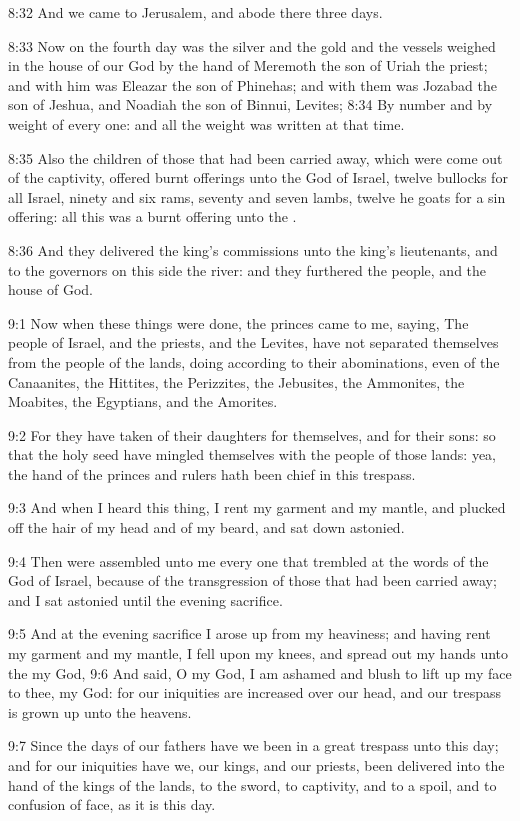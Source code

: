8:32 And we came to Jerusalem, and abode there three days.

8:33 Now on the fourth day was the silver and the gold and the vessels
weighed in the house of our God by the hand of Meremoth the son of
Uriah the priest; and with him was Eleazar the son of Phinehas; and
with them was Jozabad the son of Jeshua, and Noadiah the son of
Binnui, Levites; 8:34 By number and by weight of every one: and all
the weight was written at that time.

8:35 Also the children of those that had been carried away, which were
come out of the captivity, offered burnt offerings unto the God of
Israel, twelve bullocks for all Israel, ninety and six rams, seventy
and seven lambs, twelve he goats for a sin offering: all this was a
burnt offering unto the \LORD.

8:36 And they delivered the king's commissions unto the king's
lieutenants, and to the governors on this side the river: and they
furthered the people, and the house of God.

9:1 Now when these things were done, the princes came to me, saying,
The people of Israel, and the priests, and the Levites, have not
separated themselves from the people of the lands, doing according to
their abominations, even of the Canaanites, the Hittites, the
Perizzites, the Jebusites, the Ammonites, the Moabites, the Egyptians,
and the Amorites.

9:2 For they have taken of their daughters for themselves, and for
their sons: so that the holy seed have mingled themselves with the
people of those lands: yea, the hand of the princes and rulers hath
been chief in this trespass.

9:3 And when I heard this thing, I rent my garment and my mantle, and
plucked off the hair of my head and of my beard, and sat down
astonied.

9:4 Then were assembled unto me every one that trembled at the words
of the God of Israel, because of the transgression of those that had
been carried away; and I sat astonied until the evening sacrifice.

9:5 And at the evening sacrifice I arose up from my heaviness; and
having rent my garment and my mantle, I fell upon my knees, and spread
out my hands unto the \LORD my God, 9:6 And said, O my God, I am
ashamed and blush to lift up my face to thee, my God: for our
iniquities are increased over our head, and our trespass is grown up
unto the heavens.

9:7 Since the days of our fathers have we been in a great trespass
unto this day; and for our iniquities have we, our kings, and our
priests, been delivered into the hand of the kings of the lands, to
the sword, to captivity, and to a spoil, and to confusion of face, as
it is this day.

